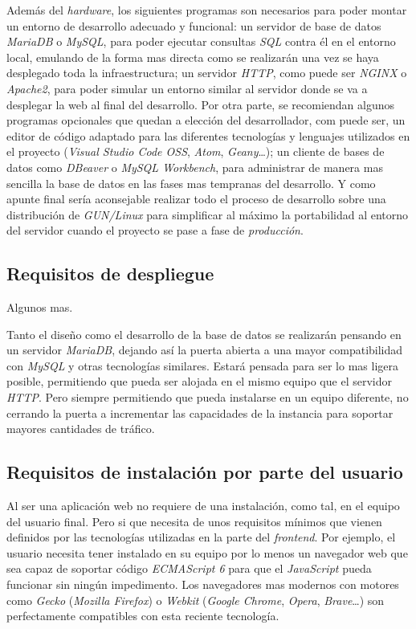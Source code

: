 \documentclass[12pt,a4paper,titlepage]{article}
\begin{document}
    Además del \textit{hardware}, los siguientes programas son necesarios para poder montar un entorno de desarrollo adecuado y funcional: un servidor de base de datos \emph{MariaDB} o \emph{MySQL}, para poder ejecutar consultas \emph{SQL} contra él en el entorno local, emulando de la forma mas directa como se realizarán una vez se haya desplegado toda la infraestructura; un servidor \textit{HTTP}, como puede ser \emph{NGINX} o \emph{Apache2}, para poder simular un entorno similar al servidor donde se va a desplegar la web al final del desarrollo. Por otra parte, se recomiendan algunos programas opcionales que quedan a elección del desarrollador, com puede ser, un editor de código adaptado para las diferentes tecnologías y lenguajes utilizados en el proyecto (\emph{Visual Studio Code OSS}, \emph{Atom}, \emph{Geany}\dots); un cliente de bases de datos como \emph{DBeaver} o \emph{MySQL Workbench}, para administrar de manera mas sencilla la base de datos en las fases mas tempranas del desarrollo. Y como apunte final sería aconsejable realizar todo el proceso de desarrollo sobre una distribución de \emph{GUN/Linux} para simplificar al máximo la portabilidad al entorno del servidor cuando el proyecto se pase a fase de \emph{producción}.

    \subsection{Requisitos de despliegue}

    Algunos mas.

    Tanto el diseño como el desarrollo de la base de datos se realizarán pensando en un servidor \emph{MariaDB}, dejando así la puerta abierta a una mayor compatibilidad con \emph{MySQL} y otras tecnologías similares. Estará pensada para ser lo mas ligera posible, permitiendo que pueda ser alojada en el mismo equipo que el servidor \emph{HTTP}. Pero siempre permitiendo que pueda instalarse en un equipo diferente, no cerrando la puerta a incrementar las capacidades de la instancia para soportar mayores cantidades de tráfico.

    \subsection{Requisitos de instalación por parte del usuario}

    Al ser una aplicación web no requiere de una instalación, como tal, en el equipo del usuario final. Pero si que necesita de unos requisitos mínimos que vienen definidos por las tecnologías utilizadas en la parte del \textit{frontend}. Por ejemplo, el usuario necesita tener instalado en su equipo por lo menos un navegador web que sea capaz de soportar código \emph{ECMAScript 6} para que el \emph{JavaScript} pueda funcionar sin ningún impedimento. Los navegadores mas modernos con motores como \emph{Gecko} (\emph{Mozilla Firefox}) o \emph{Webkit} (\emph{Google Chrome}, \emph{Opera}, \emph{Brave}\dots) son perfectamente compatibles con esta reciente tecnología.
\end{document}
